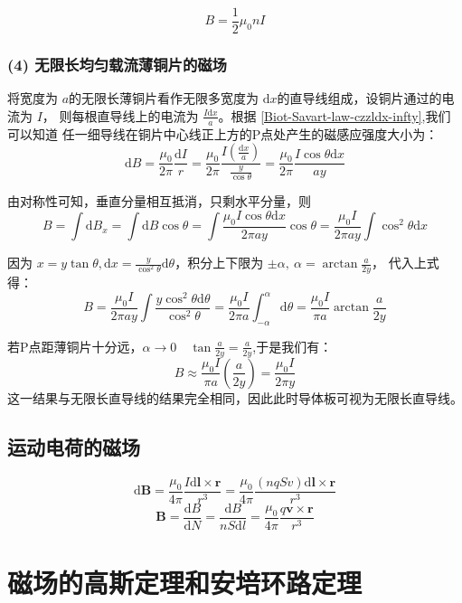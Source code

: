 \begin{equation}
  \label{Biot-Savart-law-zlzlxg-half-infty}
  B=\frac{1}{2}\mu_0nI
\end{equation}

\subsubsection{(4) 无限长均匀载流薄铜片的磁场}

将宽度为 $a$的无限长薄铜片看作无限多宽度为 $\mathrm{d}x$的直导线组成，设铜片通过的电流为 $I$，
则每根直导线上的电流为 $\displaystyle \frac{I\mathrm{d}x}{a}$。根据 \autoref{Biot-Savart-law-czzldx-infty},我们可以知道
任一细导线在铜片中心线正上方的P点处产生的磁感应强度大小为：
$$
\mathrm{d}B=\frac{\mu_0}{2\pi}\frac{\mathrm{d}I}{r}
=\frac{\mu_0}{2\pi}\frac{I(\displaystyle \frac{\mathrm{d}x}{a})}{\displaystyle \frac{y}{\cos \theta}}
=\frac{\mu_0}{2\pi}\frac{I\cos \theta \mathrm{d}x}{ay}
$$

由对称性可知，垂直分量相互抵消，只剩水平分量，则
$$
B=\int \mathrm{d}B_{x}=\int \mathrm{d} B \cos \theta=\int \frac{\mu_0I \cos \theta \mathrm{d}x}{2\pi ay}\cos \theta
=\frac{\mu_0I}{2\pi a y}\int \cos^{2}\theta \mathrm{d}x
$$

因为 $\displaystyle x=y\tan \theta ,\mathrm{d}x=\frac{y}{\cos^{2}\theta}\mathrm{d}\theta$，积分上下限为 $\displaystyle \pm \alpha,\ \alpha=\arctan \frac{a}{2y}$，
代入上式得：
$$
B=\frac{\mu_0I}{2\pi a y}\int \frac{y\cos ^{2}\theta \mathrm{d}\theta}{\cos ^{2} \theta}
=\frac{\mu_0I}{2\pi a}\int^{\alpha}_{-\alpha}\mathrm{d}\theta=\frac{\mu_0I}{\pi a}\arctan \frac{a}{2y}
$$ 

若P点距薄铜片十分远，$\displaystyle \alpha \to 0\quad \tan \frac{a}{2y}=\frac{a}{2y}$,于是我们有：
$$
B \approx \frac{\mu_0I}{\pi a}(\frac{a}{2y})=\frac{\mu_0I}{2\pi y}
$$
这一结果与无限长直导线的结果完全相同，因此此时导体板可视为无限长直导线。

\subsection{运动电荷的磁场}
$$
\mathrm{d} \boldsymbol{B}=\frac{\mu_0}{4\pi}\frac{I\mathrm{d}\boldsymbol{l}\times \boldsymbol{r}}{r^{3}}
=\frac{\mu_0}{4\pi}\frac{(nqSv)\mathrm{d}\boldsymbol{l}\times \boldsymbol{r}}{r^{3}}
$$
$$
\boldsymbol{B}=\frac{\mathrm{d}B}{\mathrm{d}N}=\frac{\mathrm{d}B}{nS\mathrm{d}l}
=\frac{\mu_0}{4\pi}\frac{q \boldsymbol{v}\times \boldsymbol{r}}{r^{3}}
$$

\section{磁场的高斯定理和安培环路定理}
